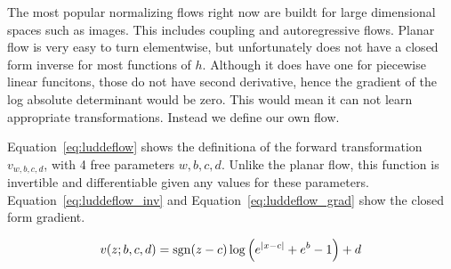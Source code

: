 \documentclass[twoside]{article}
\begin{document}
The most popular normalizing flows right now are buildt for large dimensional
spaces such as images. This includes coupling and autoregressive flows. Planar
flow is very easy to turn elementwise, but unfortunately does not have a closed
form inverse for most functions of \(h\). Although it does have one for
piecewise linear funcitons, those do not have second derivative, hence the
gradient of the log absolute determinant would be zero. This would mean it can
not learn appropriate transformations. Instead we define our own flow.

Equation~\ref{eq:luddeflow} shows the definitiona of the forward transformation
\(v_{w, b, c, d}\), with 4 free parameters \(w, b, c, d\). Unlike the planar
flow, this function is invertible and differentiable given any values for these
parameters. Equation~\ref{eq:luddeflow_inv} and
Equation~\ref{eq:luddeflow_grad} show the closed form gradient.





\begin{equation}
  v(z; b, c, d) = \operatorname{sgn}(z - c) \log \left( e^{\lvert x - c \rvert}
   + e^{b} - 1 \right) + d \label{eq:luddeflow}
\end{equation}
\end{document}
